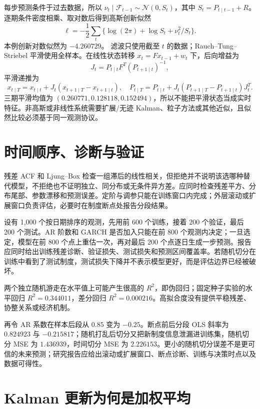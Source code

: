 

每步预测条件于过去数据，所以 $\nu_t\mid\mathcal F_{t-1}\sim\mathcal N(0,S_t)$，其中 $S_t=P_{t\mid t-1}+R$。逐期条件密度相乘、取对数后得到高斯创新似然
\[
\ell=-\frac12\sum_t\{\log(2\pi)+\log S_t+\nu_t^2/S_t\}.
\]
本例创新对数似然为 $-4.260729$。
滤波只使用截至 $t$ 的数据；Rauch--Tung--Striebel 平滑使用全样本。在线性状态转移
$x_t=Fx_{t-1}+w_t$ 下，后向增益为
\[
 J_t=P_{t\mid t}F^T(P_{t+1\mid t})^{-1},
\]
平滑递推为
\[
 x_{t\mid T}=x_{t\mid t}+J_t(x_{t+1\mid T}-x_{t+1\mid t}),
\quad
 P_{t\mid T}=P_{t\mid t}+J_t(P_{t+1\mid T}-P_{t+1\mid t})J_t^T.
\]
三期平滑均值为 $(0.260771,0.128118,0.152494)$，所以不能把平滑状态当成实时特征。非高斯或非线性系统需要扩展/无迹 Kalman、粒子方法或其他近似，且似然比较必须基于同一观测协议。

\section{时间顺序、诊断与验证}

残差 ACF 和 Ljung--Box 检查一组滞后的线性相关，但拒绝并不说明该选哪种替代模型，不拒绝也不证明独立、同分布或无条件异方差。应同时检查残差平方、分布尾部、参数漂移和预测误差。定阶与调参只能在训练窗口内完成；外层滚动或扩展窗口负责评估，必要时在制度断点处报告分段结果。


设有 1,000 个按日期排序的观测，先用前 600 个训练，接着 200 个验证，最后 200 个测试。AR 阶数和 GARCH 是否加入只能在前 800 个观测内决定；一旦选定，模型在前 800 个点上重估一次，再对最后 200 个点逐日生成一步预测。报告应同时给出训练残差诊断、验证损失、测试损失和预测区间覆盖率。若随机切分在训练中看到了测试制度，测试损失下降并不表示模型更好，而是评估边界已经被破坏。


两个独立随机游走在水平值上可能产生很高的 $R^2$，即伪回归；固定种子实验的水平回归 $R^2=0.344011$，差分回归 $R^2=0.000216$。高拟合度没有提供平稳残差、协整关系或经济机制。

再令 AR 系数在样本后段从 $0.85$ 变为 $-0.25$。断点前后分段 OLS 斜率为 $0.824923$ 与 $-0.215817$；随机打乱后切分又把新制度信息泄漏进训练集，随机切分 MSE 为 $1.436939$，时间切分 MSE 为 $2.226153$。更小的随机切分误差不是更可信的未来预测；研究报告应给出滚动或扩展窗口、断点诊断、训练与决策时点以及数据可得性。

\section{Kalman 更新为何是加权平均}

